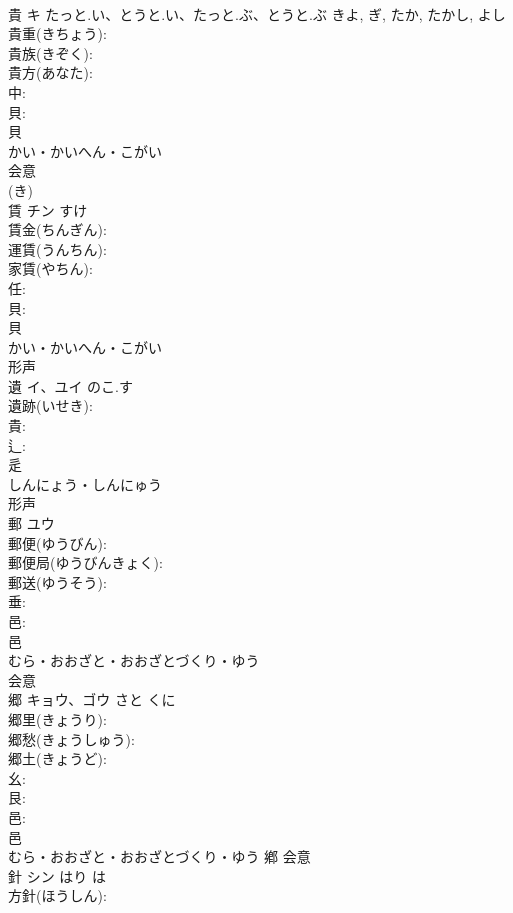 \documentclass[8pt]{extreport}
\begin{document}
\begin{CJK}{UTF8}{min}
\\	貴	キ	たっと.い、とうと.い、たっと.ぶ、とうと.ぶ	きよ, ぎ, たか, たかし, よし	
\\	貴重(きちょう): 
\\	貴族(きぞく): 
\\	貴方(あなた): 
\\	中: 
\\	貝: 
\\	貝	
\\	かい・かいへん・こがい	
\\	会意 
\\	(き) 
\\	賃	チン		すけ	
\\	賃金(ちんぎん): 
\\	運賃(うんちん): 
\\	家賃(やちん): 
\\	任: 
\\	貝: 
\\	貝	
\\	かい・かいへん・こがい	
\\	形声 
\\	遺	イ、ユイ	のこ.す		
\\	遺跡(いせき): 
\\	貴: 
\\	辶: 
\\	辵	
\\	しんにょう・しんにゅう	
\\	形声 
\\	郵	ユウ			
\\	郵便(ゆうびん): 
\\	郵便局(ゆうびんきょく): 
\\	郵送(ゆうそう): 
\\	垂: 
\\	邑: 
\\	邑	
\\	むら・おおざと・おおざとづくり・ゆう	
\\	会意 
\\	郷	キョウ、ゴウ	さと	くに	
\\	郷里(きょうり): 
\\	郷愁(きょうしゅう): 
\\	郷土(きょうど): 
\\	幺: 
\\	艮: 
\\	邑: 
\\	邑	
\\	むら・おおざと・おおざとづくり・ゆう	鄕	会意 
\\	針	シン	はり	は	
\\	方針(ほうしん): 

\end{CJK}
\end{document}

